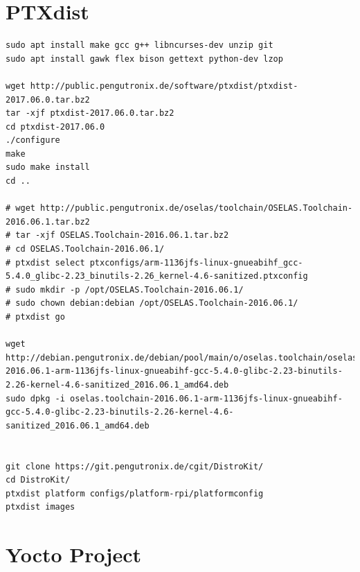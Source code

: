 \documentclass[printmode]{mgr}
\begin{document}
\section{PTXdist}




\begin{lstlisting}
sudo apt install make gcc g++ libncurses-dev unzip git
sudo apt install gawk flex bison gettext python-dev lzop

wget http://public.pengutronix.de/software/ptxdist/ptxdist-2017.06.0.tar.bz2
tar -xjf ptxdist-2017.06.0.tar.bz2
cd ptxdist-2017.06.0
./configure
make
sudo make install
cd ..

# wget http://public.pengutronix.de/oselas/toolchain/OSELAS.Toolchain-2016.06.1.tar.bz2
# tar -xjf OSELAS.Toolchain-2016.06.1.tar.bz2
# cd OSELAS.Toolchain-2016.06.1/
# ptxdist select ptxconfigs/arm-1136jfs-linux-gnueabihf_gcc-5.4.0_glibc-2.23_binutils-2.26_kernel-4.6-sanitized.ptxconfig
# sudo mkdir -p /opt/OSELAS.Toolchain-2016.06.1/
# sudo chown debian:debian /opt/OSELAS.Toolchain-2016.06.1/
# ptxdist go

wget http://debian.pengutronix.de/debian/pool/main/o/oselas.toolchain/oselas.toolchain-2016.06.1-arm-1136jfs-linux-gnueabihf-gcc-5.4.0-glibc-2.23-binutils-2.26-kernel-4.6-sanitized_2016.06.1_amd64.deb
sudo dpkg -i oselas.toolchain-2016.06.1-arm-1136jfs-linux-gnueabihf-gcc-5.4.0-glibc-2.23-binutils-2.26-kernel-4.6-sanitized_2016.06.1_amd64.deb


git clone https://git.pengutronix.de/cgit/DistroKit/
cd DistroKit/
ptxdist platform configs/platform-rpi/platformconfig
ptxdist images
\end{lstlisting}

\section{Yocto Project}
\end{document}
